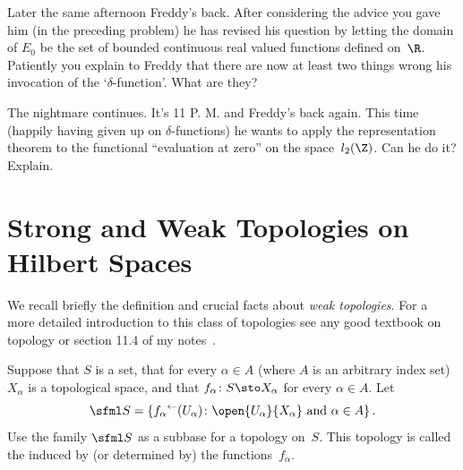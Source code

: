 \begin{exer} Later the same afternoon Freddy's back.  After considering the
advice you gave him (in the preceding problem) he has revised his
question by letting the domain of $E_0$ be the set of bounded
continuous real valued functions defined on~$\R$.  Patiently you
explain to Freddy that there are now at least two things wrong his
invocation of the `$\delta$-function'.  What are they?
\end{exer}

\begin{exer} The nightmare continues. It's 11 P. M. and Freddy's back again.
This time (happily having given up on $\delta$-functions) he wants
to apply the representation theorem to the functional ``evaluation
at zero'' on the space~$l_2(\Z)$.  Can he do it?  Explain.
\end{exer}



























\section{Strong and Weak Topologies on Hilbert Spaces}
We recall briefly the definition and crucial facts about \emph{weak topologies}.  For a more detailed introduction
to this class of topologies see any good textbook on topology or section 11.4 of my notes~\cite{Erdman:2007}.

\begin{defn}\label{C021414} Suppose that $S$ is a set, that for every $\alpha \in A$ (where
$A$ is an arbitrary index set) $X_\alpha$ is a topological space, and that $f_\alpha
\colon S \sto X_\alpha$ for every $\alpha \in A$. Let
   \[ \sfml S = \{{f_\alpha}^\gets(U_\alpha) \colon \open{U_\alpha}{X_\alpha}
                                             \text{ and } \alpha \in A\}\,. \]
Use the family $\sfml S$ as a subbase for a topology on~$S$.  This topology is called the
 induced by (or determined by) the functions~$f_\alpha$.
\end{defn}


